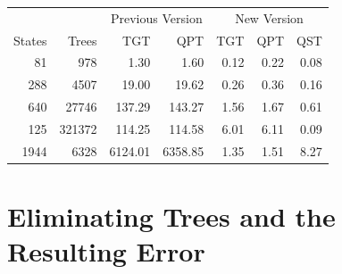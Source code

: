 \documentclass[12pt]{article}
\begin{document}
\begin{table}
	\centering
    \begin{tabular}{|r|r||r|r||r|r|r|}
\hline
& & \multicolumn{2}{c||}{Previous Version}
& \multicolumn{3}{c|}{New Version}
\\
\cline{3-7}
	    States & Trees  & TGT & QPT 
& TGT & QPT    & QST    \\ 
\hline
	    81     & 978    
& 1.30 	  & 1.60
& 0.12 	& 0.22  & 0.08  
\\ \hline
	    288    & 4507   
& 19.00   & 19.62   
& 0.26	& 0.36  & 0.16
\\ \hline
	    640    & 27746  
& 137.29  & 143.27  
& 1.56	& 1.67  & 0.61
\\ \hline
	    125    & 321372 
& 114.25  & 114.58  
& 6.01	& 6.11  & 0.09
\\ \hline
	    1944   & 6328   
& 6124.01 & 6358.85 
& 1.35	& 1.51  & 8.27
\\ \hline
	\end{tabular}
	\label{tab:times}
\end{table}








\section{Eliminating Trees and
the Resulting Error}
\label{sec:approx}
\end{document}
